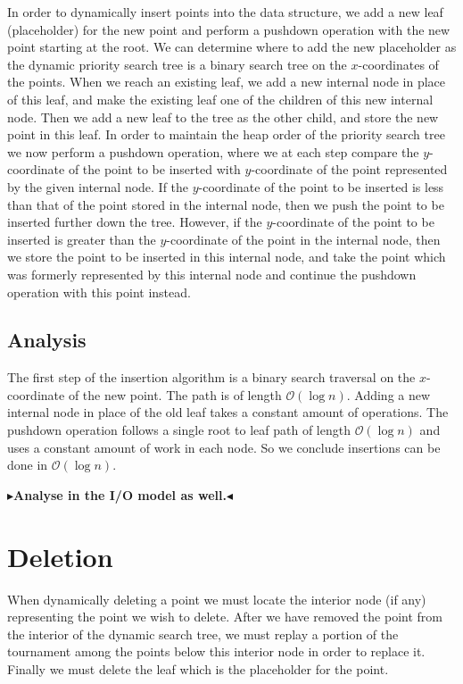 \documentclass[twoside,11pt,openright]{report}
\newcommand{\todo}[1]{{\color[rgb]{.5,0,0}\textbf{$\blacktriangleright$#1$\blacktriangleleft$}}}
\begin{document}
In order to dynamically insert points into the data structure, we add a new leaf (placeholder) for the new point and perform a pushdown operation with the new point starting at the root. We can determine where to add the new placeholder as the dynamic priority search tree is a binary search tree on the $x$-coordinates of the points. When we reach an existing leaf, we add a new internal node in place of this leaf, and make the existing leaf one of the children of this new internal node. Then we add a new leaf to the tree as the other child, and store the new point in this leaf. In order to maintain the heap order of the priority search tree we now perform a pushdown operation, where we at each step compare the $y$-coordinate of the point to be inserted with $y$-coordinate of the point represented by the given internal node. If the $y$-coordinate of the point to be inserted is less than that of the point stored in the internal node, then we push the point to be inserted further down the tree. However, if the $y$-coordinate of the point to be inserted is greater than the $y$-coordinate of the point in the internal node, then we store the point to be inserted in this internal node, and take the point which was formerly represented by this internal node and continue the pushdown operation with this point instead.

\subsection{Analysis}

The first step of the insertion algorithm is a binary search traversal on the $x$-coordinate of the new point. The path is of length $\mathcal{O}(\log n)$. Adding a new internal node in place of the old leaf takes a constant amount of operations. The pushdown operation follows a single root to leaf path of length $\mathcal{O}(\log n)$ and uses a constant amount of work in each node. So we conclude insertions can be done in $\mathcal{O}(\log n)$.

\todo{Analyse in the I/O model as well.}

\section{Deletion}

When dynamically deleting a point we must locate the interior node (if any) representing the point we wish to delete. After we have removed the point from the interior of the dynamic search tree, we must replay a portion of the tournament among the points below this interior node in order to replace it. Finally we must delete the leaf which is the placeholder for the point.
\end{document}
